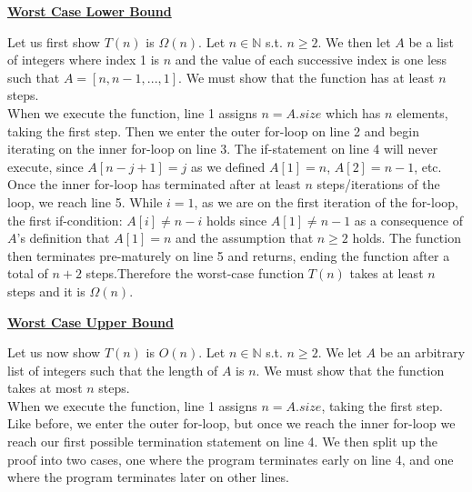 \documentclass[20pt]{article}
\begin{document}
\noindent
\underline{\textbf{Worst Case Lower Bound}}\\
\begin{text}
    \indent Let us first show $T(n)$ is $\Omega(n)$. Let $n \in \mathbb{N}$ s.t. $n \geq 2$. We then let $A$ be a list of integers where index 1 is $n$ and the value of each successive index is one less such that $A = [n, n - 1,...,1]$. We must show that the function has at least $n$ steps.\\
    \noindent
    \indent When we execute the function, line 1 assigns $n = A.size$ which has $n$ elements, taking the first step. Then we enter the outer for-loop on line 2 and begin iterating on the inner for-loop on line 3. The if-statement on line 4 will never execute, since $A[n-j+1] = j$ as we defined $A[1] = n$, $A[2] = n-1$, etc. Once the inner for-loop has terminated after at least $n$ steps/iterations of the loop, we reach line 5. While $i = 1$, as we are on the first iteration of the for-loop, the first if-condition: $A[i] \neq n-i$ holds since $A[1] \neq n-1$ as a consequence of $A$'s definition that $A[1]=n$ and the assumption that $n \geq 2$ holds. The function then terminates pre-maturely on line 5 and returns, ending the function after a total of $n + 2$ steps.Therefore the worst-case function $T(n)$ takes at least $n$ steps and it is $\Omega(n)$.\\
\end{text}

\noindent
\underline{\textbf{Worst Case Upper Bound}}\\
\begin{text}
    \indent Let us now show $T(n)$ is $O(n)$. Let $n \in \mathbb{N}$ s.t. $n \geq 2$. We let $A$ be an arbitrary list of integers such that the length of $A$ is $n$. We must show that the function takes at most $n$ steps.\\
    \noindent
    \indent When we execute the function, line 1 assigns $n=A.size$, taking the first step. Like before, we enter the outer for-loop, but once we reach the inner for-loop we reach our first possible termination statement on line 4. We then split up the proof into two cases, one where the program terminates early on line 4, and one where the program terminates later on other lines.\\
\end{text}
\end{document}
